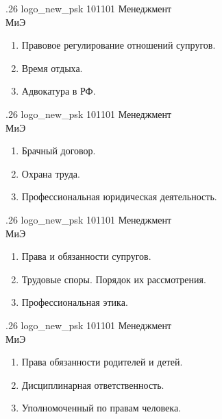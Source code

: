 \documentclass[
	12pt,
	a4paper,
	]
	{article}
\newcommand{\shapkFull}{
	\shapk
		{.26}
		{logo_new_psk}
		{101101}
		{Менеджмент\\}
		{МиЭ}
		{}
}
\begin{document}
\newpage


\shapkFull
\setcounter{zad}{0}

\begin{enumerate}
	\item Правовое регулирование отношений супругов.

	\item Время отдыха.

	\item Адвокатура в РФ.

\end{enumerate}

\newpage


\shapkFull
\setcounter{zad}{0}

\begin{enumerate}
	\item Брачный договор.

	\item Охрана труда.

	\item Профессиональная юридическая деятельность.

\end{enumerate}

\newpage


\shapkFull
\setcounter{zad}{0}

\begin{enumerate}
	\item Права и обязанности супругов.

	\item Трудовые споры. Порядок их рассмотрения.

	\item Профессиональная этика.

\end{enumerate}

\newpage


\shapkFull
\setcounter{zad}{0}

\begin{enumerate}
	\item Права обязанности родителей и детей.

	\item Дисциплинарная ответственность.

	\item Уполномоченный по правам человека.

\end{enumerate}
\end{document}

